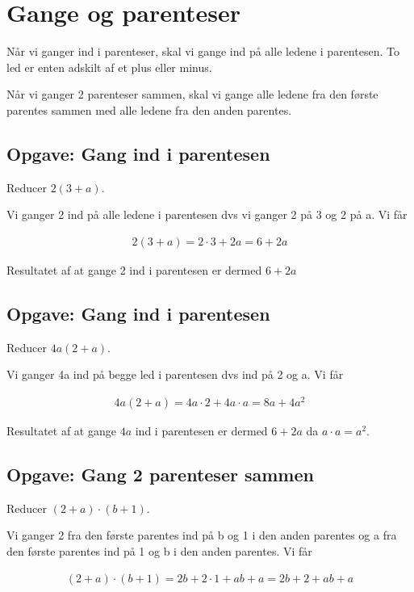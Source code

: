 \section{Gange og parenteser}

Når vi ganger ind i parenteser, skal vi gange ind på alle ledene i parentesen. To led er enten adskilt af et plus eller minus.

Når vi ganger 2 parenteser sammen, skal vi gange alle ledene fra den første parentes sammen med alle ledene fra den anden parentes.

\subsection{Opgave: Gang ind i parentesen}
Reducer $2(3+a)$.

Vi ganger 2 ind på alle ledene i parentesen dvs vi ganger 2 på 3 og 2 på a. Vi får

\begin{align*}
2(3+a) = 2\cdot 3 + 2a = 6 + 2a
\end{align*}

Resultatet af at gange 2 ind i parentesen er dermed $6 + 2a$

\subsection{Opgave: Gang ind i parentesen}
Reducer $4a(2+a)$.

Vi ganger 4a ind på begge led i parentesen dvs ind på 2 og a. Vi får

\begin{align*}
4a(2+a) = 4a\cdot 2 + 4a\cdot a = 8a + 4a^2
\end{align*}

Resultatet af at gange $4a$ ind i parentesen er dermed $6 + 2a$ da $a\cdot a = a^2$.

\subsection{Opgave: Gang 2 parenteser sammen}
Reducer $(2+a)\cdot (b+1)$.

Vi ganger 2 fra den første parentes ind på b og 1 i den anden parentes og a fra den første parentes ind på 1 og b i den anden parentes. Vi får

\begin{align*}
(2+a)\cdot (b+1) = 2b + 2\cdot 1 + ab + a = 2b + 2 + ab + a
\end{align*}

